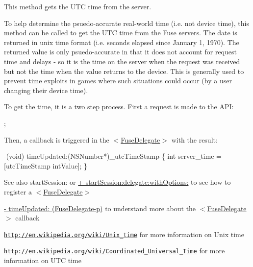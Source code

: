 This method gets the U\+T\+C time from the server. 

To help determine the psuedo-\/accurate real-\/world time (i.\+e. not device time), this method can be called to get the U\+T\+C time from the Fuse servers. The date is returned in unix time format (i.\+e. seconds elapsed since January 1, 1970). The returned value is only psuedo-\/accurate in that it does not account for request time and delays -\/ so it is the time on the server when the request was received but not the time when the value returns to the device. This is generally used to prevent time exploits in games where such situations could occur (by a user changing their device time).

To get the time, it is a two step process. First a request is made to the A\+P\+I\+:


\begin{DoxyCode}
;
\end{DoxyCode}


Then, a callback is triggered in the $<$\hyperlink{protocol_fuse_delegate-p}{Fuse\+Delegate}$>$ with the result\+:


\begin{DoxyCode}
-(void) timeUpdated:(NSNumber*)\_utcTimeStamp
\{
   \textcolor{keywordtype}{int} server\_time = [utcTimeStamp intValue];
\}
\end{DoxyCode}


\begin{DoxySeeAlso}{See also}
start\+Session\+: or \hyperlink{interface_fuse_s_d_k_adf7ed64a02b9540c9ded4b931ea4e400}{+ start\+Session\+:delegate\+:with\+Options\+:} to see how to register a $<$\hyperlink{protocol_fuse_delegate-p}{Fuse\+Delegate}$>$ 

\hyperlink{protocol_fuse_delegate-p_a85c5468cf940315584698956edcbbdfd}{-\/ time\+Updated\+: (\+Fuse\+Delegate-\/p)} to understand more about the $<$\hyperlink{protocol_fuse_delegate-p}{Fuse\+Delegate}$>$ callback 

\href{http://en.wikipedia.org/wiki/Unix_time}{\tt http\+://en.\+wikipedia.\+org/wiki/\+Unix\+\_\+time} for more information on Unix time 

\href{http://en.wikipedia.org/wiki/Coordinated_Universal_Time}{\tt http\+://en.\+wikipedia.\+org/wiki/\+Coordinated\+\_\+\+Universal\+\_\+\+Time} for more information on U\+T\+C time 
\end{DoxySeeAlso}
\hypertarget{interface_fuse_s_d_k_adb67f99bc2972de6774949fc2849f548}{}
